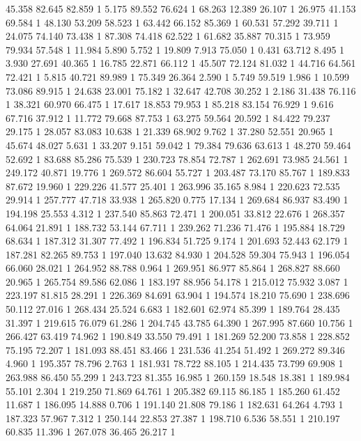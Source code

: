 	45.358	82.645	82.859	1
	5.175	89.552	76.624	1
	68.263	12.389	26.107	1
	26.975	41.153	69.584	1
	48.130	53.209	58.523	1
	63.442	66.152	85.369	1
	60.531	57.292	39.711	1
	24.075	74.140	73.438	1
	87.308	74.418	62.522	1
	61.682	35.887	70.315	1
	73.959	79.934	57.548	1
	11.984	5.890	5.752	1
	19.809	7.913	75.050	1
	0.431	63.712	8.495	1
	3.930	27.691	40.365	1
	16.785	22.871	66.112	1
	45.507	72.124	81.032	1
	44.716	64.561	72.421	1
	5.815	40.721	89.989	1
	75.349	26.364	2.590	1
	5.749	59.519	1.986	1
	10.599	73.086	89.915	1
	24.638	23.001	75.182	1
	32.647	42.708	30.252	1
	2.186	31.438	76.116	1
	38.321	60.970	66.475	1
	17.617	18.853	79.953	1
	85.218	83.154	76.929	1
	9.616	67.716	37.912	1
	11.772	79.668	87.753	1
	63.275	59.564	20.592	1
	84.422	79.237	29.175	1
	28.057	83.083	10.638	1
	21.339	68.902	9.762	1
	37.280	52.551	20.965	1
	45.674	48.027	5.631	1
	33.207	9.151	59.042	1
	79.384	79.636	63.613	1
	48.270	59.464	52.692	1
	83.688	85.286	75.539	1
	230.723	78.854	72.787	1
	262.691	73.985	24.561	1
	249.172	40.871	19.776	1
	269.572	86.604	55.727	1
	203.487	73.170	85.767	1
	189.833	87.672	19.960	1
	229.226	41.577	25.401	1
	263.996	35.165	8.984	1
	220.623	72.535	29.914	1
	257.777	47.718	33.938	1
	265.820	0.775	17.134	1
	269.684	86.937	83.490	1
	194.198	25.553	4.312	1
	237.540	85.863	72.471	1
	200.051	33.812	22.676	1
	268.357	64.064	21.891	1
	188.732	53.144	67.711	1
	239.262	71.236	71.476	1
	195.884	18.729	68.634	1
	187.312	31.307	77.492	1
	196.834	51.725	9.174	1
	201.693	52.443	62.179	1
	187.281	82.265	89.753	1
	197.040	13.632	84.930	1
	204.528	59.304	75.943	1
	196.054	66.060	28.021	1
	264.952	88.788	0.964	1
	269.951	86.977	85.864	1
	268.827	88.660	20.965	1
	265.754	89.586	62.086	1
	183.197	88.956	54.178	1
	215.012	75.932	3.087	1
	223.197	81.815	28.291	1
	226.369	84.691	63.904	1
	194.574	18.210	75.690	1
	238.696	50.112	27.016	1
	268.434	25.524	6.683	1
	182.601	62.974	85.399	1
	189.764	28.435	31.397	1
	219.615	76.079	61.286	1
	204.745	43.785	64.390	1
	267.995	87.660	10.756	1
	266.427	63.419	74.962	1
	190.849	33.550	79.491	1
	181.269	52.200	73.858	1
	228.852	75.195	72.207	1
	181.093	88.451	83.466	1
	231.536	41.254	51.492	1
	269.272	89.346	4.960	1
	195.357	78.796	2.763	1
	181.931	78.722	88.105	1
	214.435	73.799	69.908	1
	263.988	86.450	55.299	1
	243.723	81.355	16.985	1
	260.159	18.548	18.381	1
	189.984	55.101	2.304	1
	219.250	71.869	64.761	1
	205.382	69.115	86.185	1
	185.260	61.452	11.687	1
	186.095	14.888	0.706	1
	191.140	21.808	79.186	1
	182.631	64.264	4.793	1
	187.323	57.967	7.312	1
	250.144	22.853	27.387	1
	198.710	6.536	58.551	1
	210.197	60.835	11.396	1
	267.078	36.465	26.217	1
